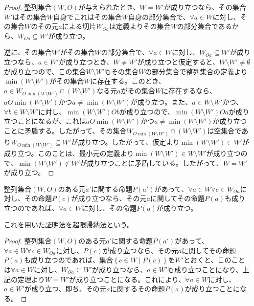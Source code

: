 \documentclass[dvipdfmx]{jsarticle}
\begin{document}
\begin{proof}
整列集合$(W,O)$が与えられたとき、$W = W'$が成り立つなら、その集合$W'$はその集合$W$自身でこれはその集合$W$自身の部分集合で、$\forall a \in W$に対し、その集合$W$のその元$a$による切片$W_{Oa}$は定義よりその集合$W$の部分集合であるから、$W_{Oa} \subseteq W'$が成り立つ。\par
逆に、その集合$W'$がその集合$W$の部分集合で、$\forall a \in W$に対し、$W_{Oa} \subseteq W'$が成り立つなら、$a \in W'$が成り立つとき、$W \neq W'$が成り立つと仮定すると、$W \setminus W' \neq \emptyset $が成り立つので、この集合$W \setminus W'$もその集合$W$の部分集合で整列集合の定義より$\min\left( W \setminus W' \right)$がその集合$W$に存在する。このとき、$a \in W_{O\min\left( W \setminus W' \right)} \cap \left( W \setminus W' \right)$なる元$a$がその集合$W$に存在するなら、$aO\min\left( W \setminus W' \right)$かつ$a \neq \min\left( W \setminus W' \right)$が成り立つ。また、$a \in W \setminus W'$かつ、$\forall b \in W \setminus W'$に対し、$\min\left( W \setminus W' \right)Ob$が成り立つので、$\min\left( W \setminus W' \right)Oa$が成り立つことになるが、これは$aO\min\left( W \setminus W' \right)$かつ$a \neq \min\left( W \setminus W' \right)$が成り立つことに矛盾する。したがって、その集合$W_{O\min\left( W \setminus W' \right)} \cap \left( W \setminus W' \right)$は空集合であり$W_{O\min\left( W \setminus W' \right)} \subseteq W'$が成り立つ。したがって、仮定より$\min\left( W \setminus W' \right) \in W'$が成り立つ。このことは、最小元の定義より$\min\left( W \setminus W' \right) \in W \setminus W'$が成り立つので、$\min\left( W \setminus W' \right) \notin W'$が成り立つことに矛盾している。したがって、$W = W'$が成り立つ。
\end{proof}
\begin{thm}[超限帰納法]\label{1.3.2.9}
整列集合$(W,O)$のある元$a'$に関する命題$P\left( a' \right)$があって、$\forall a \in W\forall c \in W_{Oa}$に対し、その命題$P(c)$が成り立つなら、その元$a$に関してその命題$P(a)$も成り立つのであれば、$\forall a \in W$に対し、その命題$P(a)$が成り立つ。
\end{thm}\par
これを用いた証明法を超限帰納法という。
\begin{proof}
整列集合$(W,O)$のある元$a'$に関する命題$P\left( a' \right)$があって、$\forall a \in W\forall c \in W_{Oa}$に対し、$P(c)$が成り立つなら、その元$a$に関してその命題$P(a)$も成り立つのであれば、集合$\left\{ c \in W \middle| P(c) \right\}$を$W'$とおくと、このことは$\forall a \in W$に対し、$W_{Oa} \subseteq W'$が成り立つなら、$a \in W'$も成り立つことになり、上記の定理より$W = W'$が成り立つことになる。これにより、$\forall a \in W$に対し、$a \in W'$が成り立つ、即ち、その元$a$に関するその命題$P(a)$が成り立つことになる。
\end{proof}
\end{document}
